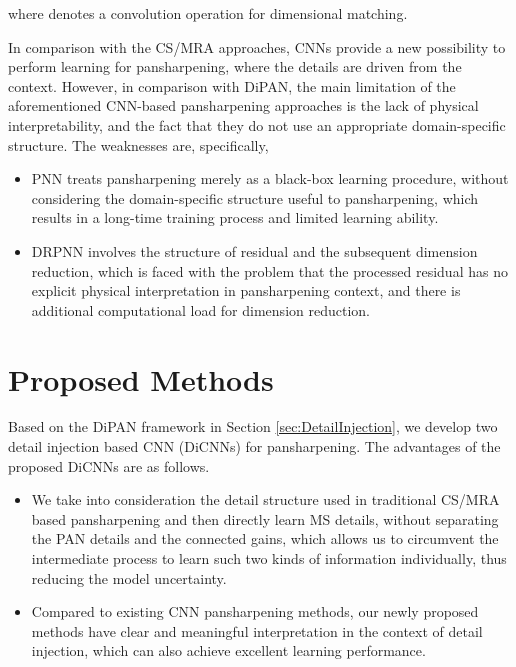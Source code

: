 \documentclass[journal]{IEEEtran}
\begin{document}
where  denotes a convolution operation for dimensional matching.

In comparison with the CS/MRA approaches, CNNs provide a new possibility to perform learning for pansharpening, where the details are driven from the context. However, in comparison with DiPAN, the main limitation of the aforementioned CNN-based pansharpening approaches is the lack of physical interpretability, and the fact that they do not use an appropriate domain-specific structure. The weaknesses are, specifically,
\begin{itemize}
\item PNN treats pansharpening merely as a black-box learning procedure, without considering the domain-specific structure useful to pansharpening, which results in a long-time training process and limited learning ability.
\item DRPNN involves the structure of residual and the subsequent dimension reduction, which is faced with the problem that the processed residual has no explicit physical interpretation in pansharpening context, and there is additional computational load for dimension reduction.
\end{itemize}

\section{Proposed Methods}\label{sec:Methods}

Based on the DiPAN framework in Section \ref{sec:DetailInjection}, we develop two detail injection based CNN (DiCNNs) for pansharpening. The advantages of the proposed DiCNNs are as follows.
\begin{itemize}
\item We take into consideration the detail structure used in traditional CS/MRA based pansharpening and then directly learn MS details, without separating the PAN details and the connected gains, which allows us to circumvent the intermediate process to learn such two kinds of information individually, thus reducing the model uncertainty.

\item Compared to existing CNN pansharpening methods, our newly proposed methods have clear and meaningful interpretation in the context of detail injection, which can also achieve excellent learning performance.

\end{itemize}
\end{document}
